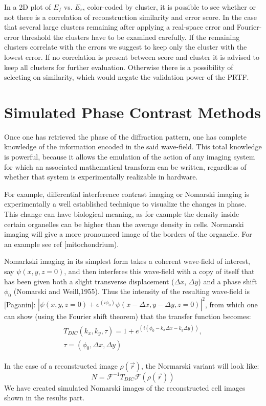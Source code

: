 In a 2D plot of $E_f$ vs. $E_r$, color-coded by cluster, it is possible to see whether or not there is a correlation of reconstruction similarity and error score.  In the case that several large clusters remaining after applying a real-space error and Fourier-error threshold the clusters have to be examined carefully. If the remaining clusters correlate with the errors we suggest to keep only the cluster with the lowest error. If no correlation is present between score and cluster it is advised to keep all clusters for further evaluation. Otherwise there is a possibility of selecting on similarity, which would negate the validation power of the PRTF.

 
\section{Simulated Phase Contrast Methods}
Once one has retrieved the phase of the diffraction pattern, one has complete knowledge of the information encoded in the said wave-field. This total knowledge is powerful, because it allows the emulation of the action of any imaging system for which an associated mathematical transform can be written, regardless of whether that system is experimentally realizable in hardware.

For example, differential interference contrast imaging or Nomarski imaging is experimentally a well established technique to visualize the changes in phase. This change can have biological meaning, as for example the density inside certain organelles can be higher than the average density in cells. Normarski imaging will give a more pronounced image of the borders of the organelle. For an example see ref [mitochondrium). 

Nomarkski imaging in its simplest form takes a coherent wave-field of interest, say $\psi(x,y,z = 0)$, and then interferes this wave-field with a copy of itself that has been given both a slight transverse displacement ($\Delta x$, $\Delta y$) and a phase shift $\phi_0$ (Nomarski and Weill,1955). Thus the intensity of the resulting wave-field is [Paganin]:
$|\psi(x,y,z=0)+ e^{(i\phi_0)} \psi(x - \Delta x,y - \Delta y,z=0) |^2$, from which one can show (using the Fourier shift theorem) that the transfer function becomes:
\begin{equation}
\begin{aligned}
\begin{split}
T_{DIC}(k_x, k_y, \tau) = 1 + e^{(i(\phi_0 - k_x \Delta x - k_y \Delta y))},\\
\tau = (\phi_0, \Delta x, \Delta y)
\end{split}
\end{aligned}
\end{equation}

In the case of a reconstructed image $\rho(\vec{r})$, the Normarski variant will look like:
\begin{equation}
N = \mathcal{F}^{-1} T_{DIC} \mathcal{F}(\rho(\vec{r}))
\end{equation}
We have created simulated Nomarski images of the reconstructed cell images shown in the results part.



